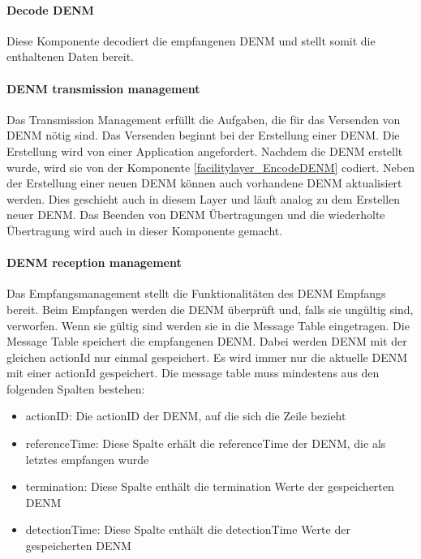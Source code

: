 \paragraph{Decode DENM}
Diese Komponente decodiert die empfangenen \ac{DENM} und stellt somit die enthaltenen Daten bereit.

\paragraph{DENM transmission management}
Das Transmission Management erfüllt die Aufgaben, die für das Versenden von \ac{DENM} nötig sind. Das Versenden beginnt bei der Erstellung einer \ac{DENM}. Die Erstellung wird von einer Application angefordert. Nachdem die \ac{DENM} erstellt wurde, wird sie von der Komponente \ref{facilitylayer_EncodeDENM} codiert. Neben der Erstellung einer neuen \ac{DENM} können auch vorhandene \ac{DENM} aktualisiert werden. Dies geschieht auch in diesem Layer und läuft analog zu dem Erstellen neuer \ac{DENM}. Das Beenden von \ac{DENM} Übertragungen und die wiederholte Übertragung wird auch in dieser Komponente gemacht.

\paragraph{DENM reception management}
Das Empfangsmanagement stellt die Funktionalitäten des \ac{DENM} Empfangs bereit. Beim Empfangen werden die \ac{DENM} überprüft und, falls sie ungültig sind, verworfen. Wenn sie gültig sind werden sie in die Message Table eingetragen. Die Message Table speichert die empfangenen \ac{DENM}. Dabei werden \ac{DENM} mit der gleichen actionId nur einmal gespeichert. Es wird immer nur die aktuelle \ac{DENM} mit einer actionId gespeichert. Die message table muss mindestens aus den folgenden Spalten bestehen:

\begin{itemize}
	\item actionID: Die actionID der \ac{DENM}, auf die sich die Zeile bezieht
	\item referenceTime: Diese Spalte erhält die referenceTime der \ac{DENM}, die als letztes empfangen wurde
	\item termination: Diese Spalte enthält die termination Werte der gespeicherten \ac{DENM}
	\item detectionTime: Diese Spalte enthält die detectionTime Werte der gespeicherten \ac{DENM}
\end{itemize}

